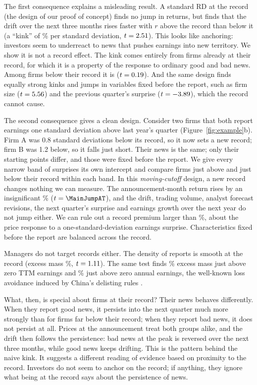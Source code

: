 \documentclass[11pt]{article}
\begin{document}
The first consequence explains a misleading result. A standard RD at the record (the design of our proof of concept)
finds no jump in returns, but finds that the drift over the next three months rises faster with $r$ above the
record than below it (a ``kink'' of \NaiveKinkD\% per standard deviation, $t=2.51$). This looks like
anchoring: investors seem to underreact to news that pushes earnings into new territory. We show it is not a record
effect. The kink comes entirely from firms already at their record, for which it is a property of the response to
ordinary good and bad news. Among firms below their record it is \NaiveKinkBelow{} ($t=0.19$). And the same design finds
equally strong kinks and jumps in variables fixed before the report, such as firm size ($t=5.56$) and the
previous quarter's surprise ($t=-3.89$), which the record cannot cause.

The second consequence gives a clean design. Consider two firms that both report earnings one standard deviation
above last year's quarter (Figure~\ref{fig:example}b). Firm A was 0.8 standard deviations below its record, so it now
sets a new record; firm B was 1.2 below, so it falls just short. Their news is the same; only their starting points
differ, and those were fixed before the report. We give every narrow band of surprises its own intercept and compare
firms just above and just below their record within each band. In this \emph{moving-cutoff} design, a new record
changes nothing we can measure. The announcement-month return rises by an insignificant \MainJumpA\% ($t=\MainJumpAT$),
and the drift, trading volume, analyst forecast revisions, the next quarter's surprise and earnings growth over the next
year do not jump either. We can rule out a record premium larger than \CIAtwohi\%, about the price response to a
one-standard-deviation earnings surprise. Characteristics fixed before the report are balanced across the record.

Managers do not target records either. The density of reports is smooth at the record (excess mass \BunchRec\%,
$t=1.11$). The same test finds \BunchZero\% excess mass just above zero TTM earnings and \BunchZeroFY\% just above
zero annual earnings, the well-known loss avoidance induced by China's delisting rules \citep{chen2004,haw2005}.

What, then, is special about firms at their record? Their news behaves differently. When they report good news, it
persists into the next quarter much more strongly than for firms far below their record; when they report bad news, it
does not persist at all. Prices at the announcement treat both groups alike, and the drift then follows the
persistence: bad news at the peak is reversed over the next three months, while good news keeps drifting. This is the
pattern behind the naive kink. It suggests a different reading of evidence based on proximity to the record. Investors
do not seem to anchor on the record; if anything, they ignore what being at the record says about the persistence of
news.
\end{document}
